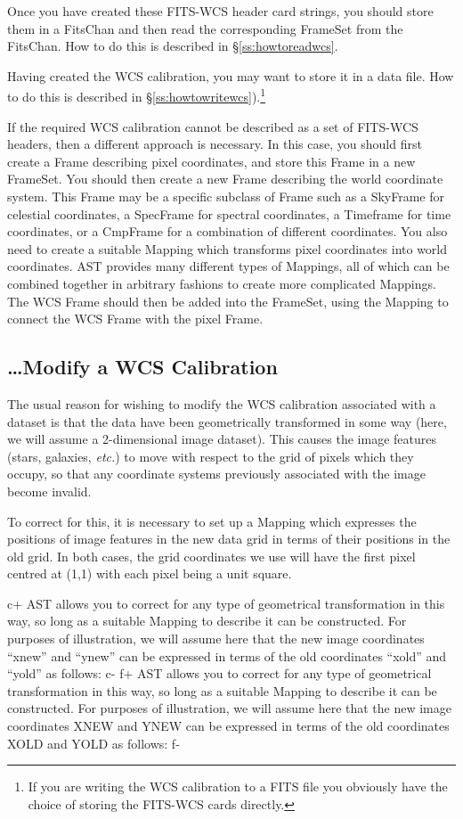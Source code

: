 \documentclass[twoside,11pt]{starlink}
\providecommand{\secref}[1]{\S\ref{#1}}
\begin{document}
Once you have created these FITS-WCS header card strings, you should
store them in a FitsChan and then read the corresponding FrameSet from the
FitsChan. How to do this is described in \secref{ss:howtoreadwcs}.

Having created the WCS calibration, you may want to store it in a data
file. How to do this is described in \secref{ss:howtowritewcs}).\footnote{If
you are writing the WCS calibration to a FITS file you obviously
have the choice of storing the FITS-WCS cards directly.}

If the required WCS calibration cannot be described as a set of FITS-WCS
headers, then a different approach is necessary. In this case, you should
first create a Frame describing pixel coordinates, and store this Frame
in a new FrameSet. You should then create a new Frame describing the
world coordinate system. This Frame may be a specific subclass of Frame such
as a SkyFrame for celestial coordinates, a SpecFrame for spectral
coordinates, a Timeframe for time coordinates, or a CmpFrame for a combination
of different coordinates.
You also need to create a suitable Mapping which transforms pixel
coordinates into world coordinates. AST provides many different types of
Mappings, all of which can be combined together in arbitrary fashions to
create more complicated Mappings. The WCS Frame should then be added into
the FrameSet, using the Mapping to connect the WCS Frame with the pixel
Frame.

\subsection{\label{ss:howtomodifywcs}\ldots Modify a WCS Calibration}

The usual reason for wishing to modify the WCS calibration associated
with a dataset is that the data have been geometrically transformed in
some way (here, we will assume a 2-dimensional image dataset). This
causes the image features (stars, galaxies, \emph{etc.}) to move with
respect to the grid of pixels which they occupy, so that any
coordinate systems previously associated with the image become
invalid.

To correct for this, it is necessary to set up a Mapping which
expresses the positions of image features in the new data grid in
terms of their positions in the old grid. In both cases, the grid
coordinates we use will have the first pixel centred at (1,1) with
each pixel being a unit square.

c+
AST allows you to correct for any type of geometrical transformation
in this way, so long as a suitable Mapping to describe it can be
constructed. For purposes of illustration, we will assume here that
the new image coordinates ``xnew'' and ``ynew'' can be expressed in
terms of the old coordinates ``xold'' and ``yold'' as follows:
c-
f+
AST allows you to correct for any type of geometrical transformation
in this way, so long as a suitable Mapping to describe it can be
constructed. For purposes of illustration, we will assume here that
the new image coordinates XNEW and YNEW can be expressed in terms of
the old coordinates XOLD and YOLD as follows:
f-
\end{document}
